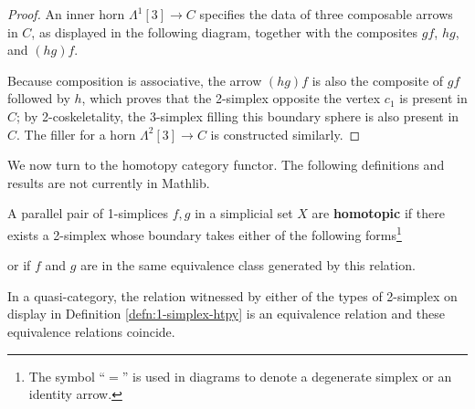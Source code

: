 \begin{proof}
 An inner horn $\Lambda^1[3] \to C$ specifies the data of three composable arrows in $C$, as displayed in the following diagram, together with the composites $gf$, $hg$, and $(hg)f$.
 \begin{center}
 \end{center}
 Because composition is associative, the arrow $(hg)f$ is also the composite of $gf$ followed by $h$, which proves that the 2-simplex opposite the vertex $c_1$ is present in $C$; by 2-coskeletality, the 3-simplex filling this boundary sphere is also present in $C$. The filler for a horn $\Lambda^2[3] \to C$ is constructed similarly.
 \end{proof}

 We now turn to the homotopy category functor. The following definitions and results are not currently in Mathlib.

 \begin{definition}\label{defn:1-simplex-htpy}
   A parallel pair of 1-sim\-plices $f,g$ in a simplicial set $X$ are \textbf{homotopic} if there exists a 2-simplex whose boundary takes either of the following forms\footnote{The symbol ``$=$'' is used in diagrams to denote a degenerate simplex or an identity arrow.}
   \begin{center}
  \end{center}
   or if $f$ and $g$ are in the same equivalence class generated by this relation.
   \end{definition}

   In a quasi-category, the relation witnessed by either of the types of 2-simplex on display in Definition \ref{defn:1-simplex-htpy} is an equivalence relation and these equivalence relations coincide.


